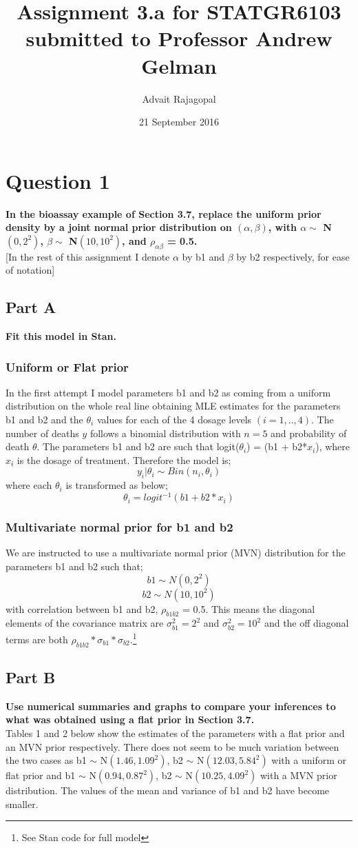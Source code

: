 \documentclass{article}
\title{Assignment 3.a for \textbf{STATGR6103}\\
\large submitted to Professor Andrew Gelman}
\date{21 September 2016}
\author{Advait Rajagopal}
\begin{document}
  \maketitle

  \section{Question 1}
\textbf{In the bioassay example of Section 3.7, replace the uniform prior density by a joint normal prior distribution on $(\alpha, \beta)$, with $\alpha \sim$ N$(0, 2^2)$, $\beta \sim$ N$(10, 10^2)$, and $\rho_{\alpha \beta} $ = 0.5.\\}
[In the rest of this assignment I denote $\alpha$ by b1 and $\beta$ by b2 respectively, for ease of notation]
\subsection{Part A}
\textbf{Fit this model in Stan.}\\
\subsubsection{Uniform or Flat prior}
In the first attempt I model parameters b1 and b2 as coming from a uniform distribution on the whole real line obtaining MLE estimates for the parameters b1 and b2 and the $\theta_i$ values for each of the 4 dosage levels $(i = 1,..,4)$. The number of deaths $y$ follows a binomial distribution with $n = 5$ and probability of death $\theta$. The parameters b1 and b2 are such that logit($\theta_i$) = (b1 + b2*$x_i$), where $x_i$ is the dosage of treatment. Therefore the  model is;
$$y_i|\theta_i \sim Bin(n_i,\theta_i)$$
where each $\theta_i$ is transformed as below;
$$ \theta_i  = logit^{-1} (b1 + b2*x_{i})$$
\subsubsection{Multivariate normal prior for b1 and b2}
We are instructed to use a multivariate normal prior (MVN) distribution for the parameters b1 and b2 such that;
$$b1 \sim N(0, 2^2) $$
$$b2 \sim N(10, 10^2) $$
with correlation between b1 and b2, $\rho_{b1b2}$ = 0.5. This means the diagonal elements of the covariance matrix are $\sigma^2_{b1} = 2^2$ and $\sigma^2_{b2} = 10^2$ and the off diagonal terms are both $\rho_{b1b2}*\sigma_{b1}*\sigma_{b2}$.\footnote{See Stan code for full model}
\newpage
\subsection{Part B}
\textbf{Use numerical summaries and graphs to compare your inferences to what was obtained using a flat prior in Section 3.7.}\\
Tables 1 and 2 below show the estimates of the parameters with a flat prior and an MVN prior respectively. There does not seem to be much variation between the two cases as b1 $\sim$ N$(1.46,1.09^2)$, b2 $\sim$ N$(12.03,5.84^2)$ with a uniform or flat prior and b1 $\sim$ N$(0.94,0.87^2)$, b2 $\sim$ N$(10.25,4.09^2)$ with a MVN prior distribution. The values of the mean and variance of b1 and b2 have become smaller.
\end{document}
